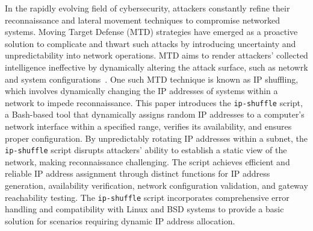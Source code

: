 In the rapidly evolving field of cybersecurity, attackers constantly refine their reconnaissance and lateral movement techniques to compromise networked systems. Moving Target Defense (MTD) strategies have emerged as a proactive solution to complicate and thwart such attacks by introducing uncertainty and unpredictability into network operations. MTD aims to render attackers' collected intelligence ineffective by dynamically altering the attack surface, such as netowrk and system configurations~\cite{8805766}.
One such MTD technique is known as IP shuffling, which involves dynamically changing the IP addresses of systems within a network to impede reconnaissance. This paper introduces the \texttt{ip-shuffle} script, a Bash-based tool that dynamically assigns random IP addresses to a computer’s network interface within a specified range, verifies its availability, and ensures proper configuration. By unpredictably rotating IP addresses within a subnet, the \texttt{ip-shuffle} script disrupts attackers’ ability to establish a static view of the network, making reconnaissance challenging. The script achieves efficient and reliable IP address assignment through distinct functions for IP address generation, availability verification, network configuration validation, and gateway reachability testing. The \texttt{ip-shuffle} script incorporates comprehensive error handling and compatibility with Linux and BSD systems to provide a basic solution for scenarios requiring dynamic IP address allocation.
